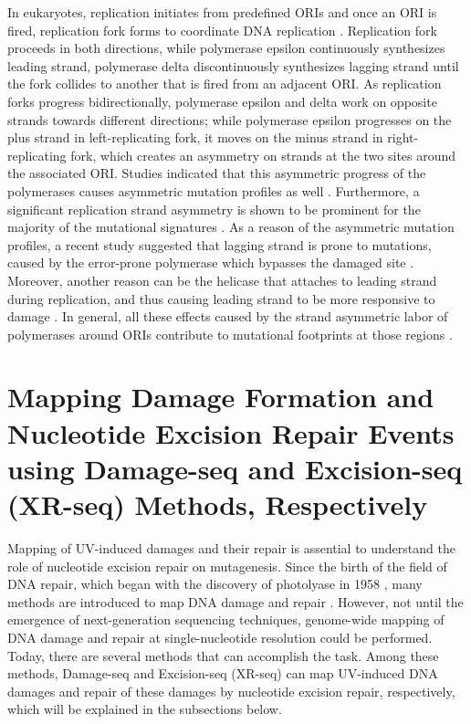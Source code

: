 In eukaryotes, replication initiates from predefined ORIs \citep{xiao2016iros,zhang2016iori} and once an ORI is fired, replication fork forms to coordinate DNA replication \citep{langston2009whither}. Replication fork proceeds in both directions, while polymerase epsilon continuously synthesizes leading strand, polymerase delta discontinuously synthesizes lagging strand until the fork collides to another that is fired from an adjacent ORI. As replication forks progress bidirectionally, polymerase epsilon and delta work on opposite strands towards different directions; while polymerase epsilon progresses on the plus strand in left-replicating fork, it moves on the minus strand in right-replicating fork, which creates an asymmetry on strands at the two sites around the associated ORI. Studies indicated that this asymmetric progress of the polymerases causes asymmetric mutation profiles as well  \citep{haradhvala2016mutational,lujan2012mismatch,reijns2015lagging,shinbrot2014exonuclease}. Furthermore, a significant replication strand asymmetry is shown to be prominent for the majority of the mutational signatures \citep{tomkova2018mutational}. As a reason of the asymmetric mutation profiles, a recent study suggested that lagging strand is prone to mutations, caused by the error-prone polymerase which bypasses the damaged site \citep{seplyarskiy2019error}. Moreover, another reason can be the helicase that attaches to leading strand during replication, and thus causing leading strand to be more responsive to damage \citep{hedglin2017eukaryotic,yeeles2013rescuing}. In general, all these effects caused by the strand asymmetric labor of polymerases around ORIs contribute to mutational footprints at those regions \citep{lujan2016dna}.

\section{Mapping Damage Formation and Nucleotide Excision Repair Events using Damage-seq and Excision-seq (XR-seq) Methods, Respectively}

Mapping of UV-induced damages and their repair is assential to understand the role of nucleotide excision repair on mutagenesis. Since the birth of the field of DNA repair, which began with the discovery of photolyase in 1958 \citep{rupert1958photoreactivation,sancar2016mechanisms}, many methods are introduced to map DNA damage and repair \citep{li2020methodologies}. However, not until the emergence of next-generation sequencing techniques, genome-wide mapping of DNA damage and repair at single-nucleotide resolution could be performed. Today, there are several methods that can accomplish the task. Among these methods, Damage-seq and Excision-seq (XR-seq) can map UV-induced DNA damages and repair of these damages by nucleotide excision repair, respectively, which will be explained in the subsections below.

